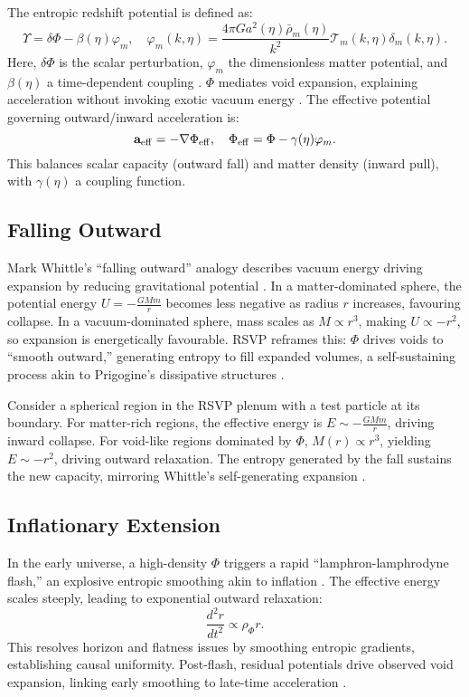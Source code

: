 \documentclass{article}
\begin{document}
{{The entropic redshift potential is defined as:
\begin{equation}
\Upsilon = \delta\Phi - \beta(\eta)\varphi_m, \quad \varphi_m(k,\eta) = \frac{4\pi G a^2(\eta) \bar{\rho}_m(\eta)}{k^2} \mathcal{T}_m(k,\eta) \delta_m(k,\eta).
\end{equation}
Here, \(\delta\Phi\) is the scalar perturbation, \(\varphi_m\) the dimensionless matter potential, and \(\beta(\eta)\) a time-dependent coupling \citep{dodelson2003}. \(\Phi\) mediates void expansion, explaining acceleration without invoking exotic vacuum energy \citep{einstein1917, desitter1917, peebles2003}. The effective potential governing outward/inward acceleration is:
\begin{equation}
\mathbf{a}_{\rm eff} = -\nabla \Phi_{\rm eff}, \quad \Phi_{\rm eff} = \Phi - \gamma(\eta) \varphi_m.
\end{equation}
This balances scalar capacity (outward fall) and matter density (inward pull), with \(\gamma(\eta)\) a coupling function.

\subsection{Falling Outward}
Mark Whittle's ``falling outward'' analogy describes vacuum energy driving expansion by reducing gravitational potential \citep{whittle2015, whittle2006}. In a matter-dominated sphere, the potential energy \( U = -\frac{G M m}{r} \) becomes less negative as radius \( r \) increases, favouring collapse. In a vacuum-dominated sphere, mass scales as \( M \propto r^3 \), making \( U \propto -r^2 \), so expansion is energetically favourable. RSVP reframes this: \(\Phi\) drives voids to ``smooth outward,'' generating entropy to fill expanded volumes, a self-sustaining process akin to Prigogine's dissipative structures \citep{prigogine1984, whittle2015}.

Consider a spherical region in the RSVP plenum with a test particle at its boundary. For matter-rich regions, the effective energy is \( E \sim -\frac{G M m}{r} \), driving inward collapse. For void-like regions dominated by \(\Phi\), \( M(r) \propto r^3 \), yielding \( E \sim -r^2 \), driving outward relaxation. The entropy generated by the fall sustains the new capacity, mirroring Whittle's self-generating expansion \citep{whittle2015}.

\subsection{Inflationary Extension}
In the early universe, a high-density \(\Phi\) triggers a rapid ``lamphron-lamphrodyne flash,'' an explosive entropic smoothing akin to inflation \citep{whittle2015}. The effective energy scales steeply, leading to exponential outward relaxation:
\begin{equation}
\frac{d^2 r}{dt^2} \propto \rho_\Phi r.
\end{equation}
This resolves horizon and flatness issues by smoothing entropic gradients, establishing causal uniformity. Post-flash, residual potentials drive observed void expansion, linking early smoothing to late-time acceleration \citep{desitter1917}.

}}
\end{document}

